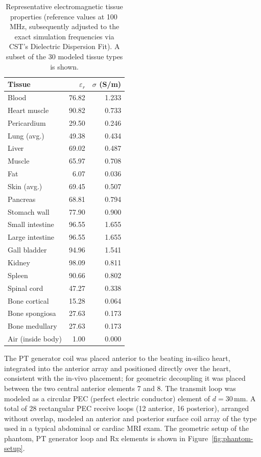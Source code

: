 \documentclass[
]{article}
\begin{document}
\begin{table}[htbp]
\centering
\caption{Representative electromagnetic tissue properties (reference values at 100\,MHz, subsequently adjusted to the exact simulation frequencies via CST's Dielectric Dispersion Fit). A subset of the 30 modeled tissue types is shown.}\label{tab:tissue-properties}

\begin{tabular}{l r r}
\hline
\textbf{Tissue} & $\varepsilon_r$ & $\sigma$ (S/m) \\
\hline
Blood             & 76.82 & 1.233 \\
Heart muscle      & 90.82 & 0.733 \\
Pericardium       & 29.50 & 0.246 \\
Lung (avg.)       & 49.38 & 0.434 \\
Liver             & 69.02 & 0.487 \\
Muscle            & 65.97 & 0.708 \\
Fat               &  6.07 & 0.036 \\
Skin (avg.)       & 69.45 & 0.507 \\
Pancreas          & 68.81 & 0.794 \\
Stomach wall      & 77.90 & 0.900 \\
Small intestine   & 96.55 & 1.655 \\
Large intestine   & 96.55 & 1.655 \\
Gall bladder      & 94.96 & 1.541 \\
Kidney            & 98.09 & 0.811 \\
Spleen            & 90.66 & 0.802 \\
Spinal cord       & 47.27 & 0.338 \\
Bone cortical     & 15.28 & 0.064 \\
Bone spongiosa    & 27.63 & 0.173 \\
Bone medullary    & 27.63 & 0.173 \\
Air (inside body) &  1.00 & 0.000 \\
\hline
\end{tabular}

\end{table}

The PT generator coil was placed anterior to the beating in-silico heart, integrated into the anterior array and positioned directly over the heart, consistent with the in-vivo placement; for geometric decoupling it was placed between the two central anterior elements 7 and 8. The transmit loop was modeled as a circular PEC (perfect electric conductor) element of $d = 30\,\mathrm{mm}$. A total of 28 rectangular PEC receive loops (12 anterior, 16 posterior), arranged without overlap, modeled an anterior and posterior surface coil array of the type used in a typical abdominal or cardiac MRI exam. The geometric setup of the phantom, PT generator loop and Rx elements is shown in Figure~\ref{fig:phantom-setup}.
\end{document}
